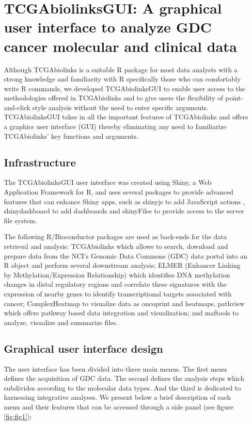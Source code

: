 \section{TCGAbiolinksGUI: A graphical user interface to analyze GDC cancer molecular and clinical data}

Although TCGAbiolinks is a suitable R package for most data analysts with a strong knowledge and familiarity with R specifically those who can comfortably write R commands, we developed TCGAbiolinksGUI to enable user access to the methodologies offered in TCGAbiolinks and to give users the flexibility of point-and-click style analysis without the need to enter specific arguments. TCGAbiolinksGUI takes in all the important features of TCGAbiolinks and offers a graphics user interface (GUI) thereby eliminating any need to familiarize TCGAbiolinks' key functions and arguments.

\subsection{Infrastructure}
The TCGAbiolinksGUI user interface was created using Shiny, a Web Application Framework for R, and uses several packages to provide advanced features that can enhance Shiny apps, such as shinyjs to add JavaScript actions \cite{shinyjs}, shinydashboard to add dashboards \cite{shinydashboard} and shinyFiles \cite{shinyFiles} to provide access to the server file system.

The following R/Bioconductor packages are used as back-ends for the data retrieval and analysis: TCGAbiolinks \cite{TCGAbiolinks} which allows to search, download and prepare data from the NCI's Genomic Data Commons (GDC) data portal into an R object and perform several downstream analysis;  ELMER (Enhancer Linking by Methylation/Expression Relationship) \cite{yao2015inferring, ELMER2} which identifies DNA methylation changes in distal regulatory regions and correlate these signatures with the expression of nearby genes to identify transcriptional targets associated with cancer; ComplexHeatmap \cite{Gu20052016} to visualize data as oncoprint and heatmaps, pathview \cite{luo2013pathview} which offers pathway based data integration and visualization; and maftools \cite{Maftools} to analyze, visualize and summarize  files.


\subsection{Graphical user interface design}
The user interface has been divided into three main  menus. The first menu defines the acquisition of GDC data. The second defines the analysis steps which subdivides according to the molecular data types.  And the third is dedicated to harnessing integrative analyses. We present below a brief description of each menu and their features that can be accessed through a side panel (see figure \ref{fig:fig1}):


